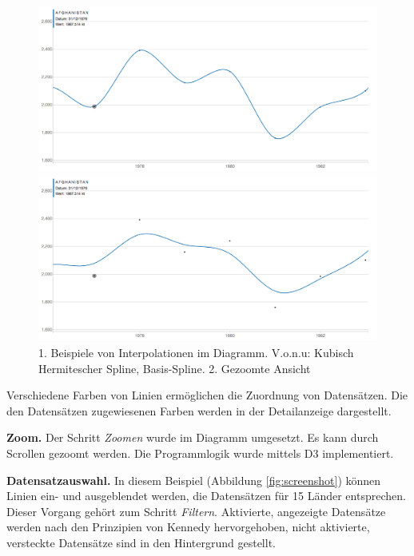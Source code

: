\begin{figure}[!htbp]
	\begin{minipage}{\textwidth}
		\centering
		\includegraphics[width=\linewidth]{images/cardinal}
	\end{minipage}
	\begin{minipage}{\textwidth}
		\centering
		\includegraphics[width=\linewidth]{images/basis}
	\end{minipage}
	\caption[Beispiele von Interpolationen und Zoom]{1. Beispiele von Interpolationen im Diagramm. V.o.n.u: Kubisch Hermitescher Spline, Basis-Spline. 2. Gezoomte Ansicht}
	\label{fig:vergleich}
\end{figure}

Verschiedene Farben von Linien ermöglichen die Zuordnung von Datensätzen. Die den Datensätzen zugewiesenen Farben werden in der Detailanzeige dargestellt.

\textbf{Zoom.} Der Schritt \textit{Zoomen} wurde im Diagramm umgesetzt. Es kann durch Scrollen gezoomt werden. Die Programmlogik wurde mittels D3 implementiert.

\textbf{Datensatzauswahl.} In diesem Beispiel (Abbildung \ref{fig:screenshot}) können Linien ein- und ausgeblendet werden, die Datensätzen für 15 Länder entsprechen. Dieser Vorgang gehört zum Schritt \textit{Filtern}. Aktivierte, angezeigte Datensätze werden nach den Prinzipien von Kennedy hervorgehoben, nicht aktivierte, versteckte Datensätze sind in den Hintergrund gestellt.

